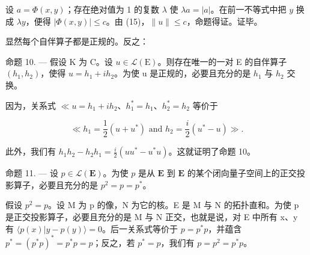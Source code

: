 设 \(a = \Phi(x, y)\)；存在绝对值为 1 的复数 \(\lambda\) 使 \(\lambda a = |a|\)。在前一不等式中把 \(y\) 换成 \(\lambda y\)，便得 \(|\Phi(x,y)| \leqslant c\)。由 (15)，\(\|u\| \leqslant c\)，命题得证。证毕。

显然每个自伴算子都是正规的。反之：

命题 10. --- 假设 K 为 C。设 \(u \in \mathcal{L}(\mathrm{E})\)。则存在唯一的一对 E 的自伴算子 \((h_1, h_2)\)，使得 \(u = h_1 + ih_2\)。为使 u 是正规的，必要且充分的是 \(h_1\) 与 \(h_2\) 交换。

因为，关系式 \(\ll u = h_1 + ih_2\)、\(h_1^* = h_1\)、\(h_2^* = h_2\) 等价于

\[
\ll h _ {1} = \frac {1}{2} (u + u ^ {*}) \text { and } h _ {2} = \frac {i}{2} (u ^ {*} - u) \gg .
\]

此外，我们有 \(h_1h_2 - h_2h_1 = \frac{i}{2} (uu^* - u^*u)\)。这就证明了命题 10。

命题 11. --- 设 \(p \in \mathcal{L}(\mathbf{E})\)。为使 \(p\) 是从 \(\mathbf{E}\) 到 \(\mathbf{E}\) 的某个闭向量子空间上的正交投影算子，必要且充分的是 \(p^2 = p = p^*\)。

假设 \(p^{2} = p\)。设 M 为 p 的像，N 为它的核。E 是 M 与 N 的拓扑直和。为使 p 是正交投影算子，必要且充分的是 M 与 N 正交，也就是说，对 E 中所有 x、y 有 \(\langle p(x)|y - p(y)\rangle = 0\)。后一关系式等价于 \(p = p^{*}p\)，并蕴含 \(p^{*} = (p^{*}p)^{*} = p^{*}p = p\)；反之，若 \(p^{*} = p\)，我们有 \(p = p^{2} = p^{*}p\)。

